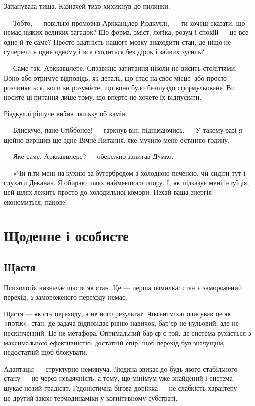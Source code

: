\documentclass[12pt, a4paper, openany]{book}
\begin{document}
\begin{terrybox}
Запанувала тиша. Казначей тихо хихикнув до пилинки.

--- Тобто, --- повільно промовив Аркканцлер Різдкуллі, --- ти хочеш сказати, що немає ніяких великих загадок? Що форма, зміст, логіка, розум і спокій --- це все одне й те саме? Просто здатність нашого мозку знаходити стан, де ніщо не суперечить одне одному і все сходиться без дірок і зайвих зусиль?

--- Саме так, Аркканцлере. Справжнє запитання ніколи не висить століттями. Воно або отримує відповідь, як деталь, що стає на своє місце, або просто розчиняється, коли ви розумієте, що воно було безглуздо сформульоване. Ви носите ці питання лише тому, що вперто не хочете їх відпускати.

Різдкуллі рішуче вибив люльку об камін.

--- Блискуче, пане Стіббонсе! --- гаркнув він, піднімаючись. --- У такому разі я щойно вирішив ще одне Вічне Питання, яке мучило мене останню годину.

--- Яке саме, Аркканцлере? --- обережно запитав Думко.

--- «Чи піти мені на кухню за бутербродом з холодною печенею, чи сидіти тут і слухати Декана». Я обираю шлях найменшого опору. І, як підказує мені інтуїція, цей шлях лежить просто до холодильної комори. Нехай ваша енергія економиться, панове!
\end{terrybox}

\chapter{Щоденне і особисте}

\section{Щастя}

Психологія визначає щастя як стан. Це — перша помилка: стан є заморожений перехід, а замороженого переходу немає.

Щастя — якість переходу, а не його результат. Чіксентміхаї описував це як «потік»: стан, де задача відповідає рівню навичок, бар'єр не нульовий, але не нескінченний. Це не метафора. Оптимальний бар'єр є той, де система рухається з максимальною ефективністю: достатній опір, щоб перехід був значущим, недостатній щоб блокувати.

Адаптація — структурно неминуча. Людина звикає до будь-якого стабільного стану --- не через невдячність, а тому, що мінімум уже знайдений і система шукає новий градієнт. Гедоністична бігова доріжка — не слабкість характеру --- це другий закон термодинаміки у когнітивному субстраті.
\end{document}
